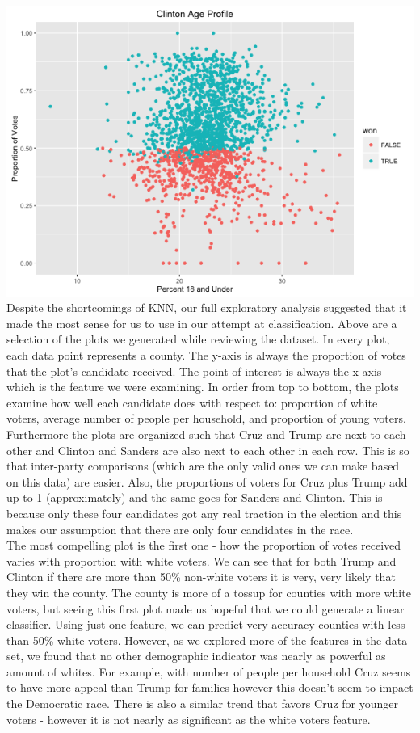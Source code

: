 \documentclass[11pt]{article}
\begin{document}
\includegraphics[scale=0.38]{../exploratory_plots/Clinton_Age.png}\\

Despite the shortcomings of KNN, our full exploratory analysis suggested that it made the most sense for us to use in our attempt at classification. Above are a selection of the plots we generated while reviewing the dataset. In every plot, each data point represents a county. The y-axis is always the proportion of votes that the plot's candidate received. The point of interest is always the x-axis which is the feature we were examining. In order from top to bottom, the plots examine how well each candidate does with respect to: proportion of white voters, average number of people per household, and proportion of young voters. Furthermore the plots are organized such that Cruz and Trump are next to each other and Clinton and Sanders are also next to each other in each row. This is so that inter-party comparisons (which are the only valid ones we can make based on this data) are easier. Also, the proportions of voters for Cruz plus Trump add up to 1 (approximately) and the same goes for Sanders and Clinton. This is because only these four candidates got any real traction in the election and this makes our assumption that there are only four candidates in the race.\\

The most compelling plot is the first one - how the proportion of votes received varies with proportion with white voters. We can see that for both Trump and Clinton if there are more than 50\% non-white voters it is very, very likely that they win the county. The county is more of a tossup for counties with more white voters, but seeing this first plot made us hopeful that we could generate a linear classifier. Using just one feature, we can predict very accuracy counties with less than 50\% white voters. However, as we explored more of the features in the data set, we found that no other demographic indicator was nearly as powerful as amount of whites. For example, with number of people per household Cruz seems to have more appeal than Trump for families however this doesn't seem to impact the Democratic race. There is also a similar trend that favors Cruz for younger voters - however it is not nearly as significant as the white voters feature. \\
\end{document}
